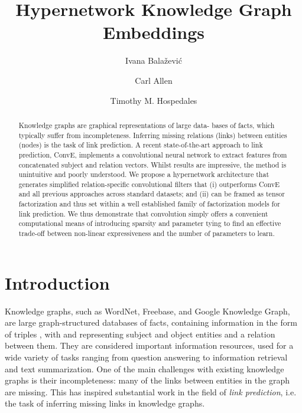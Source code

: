 \documentclass[runningheads]{llncs}
\begin{document}
\title{Hypernetwork Knowledge Graph Embeddings}
\author{Ivana Bala\v{z}evi\'c \and
Carl Allen \and
Timothy M. Hospedales}
\maketitle              \begin{abstract}
Knowledge graphs are graphical representations of large data- bases of facts, which typically suffer from incompleteness. Inferring missing relations (links) between entities (nodes) is the task of link prediction. A recent state-of-the-art approach to link prediction, ConvE, implements a convolutional neural network to extract features from concatenated subject and relation vectors. Whilst results are impressive, the method is unintuitive and poorly understood. We propose a hypernetwork architecture that generates simplified relation-specific convolutional filters that (i) outperforms ConvE and all previous approaches across standard datasets; and (ii) can be framed as tensor factorization and thus set within a well established family of factorization models for link prediction. We thus demonstrate that convolution simply offers a convenient computational means of introducing sparsity and parameter tying to find an effective trade-off between non-linear expressiveness and the number of parameters to learn.

\end{abstract}
\section{Introduction}

Knowledge graphs, such as WordNet, Freebase, and Google Knowledge Graph, are large graph-structured databases of facts, containing information in the form of triples , with  and  representing subject and object entities and  a relation between them. They are considered important information resources, used for a wide variety of tasks ranging from question answering to information retrieval and text summarization. One of the main challenges with existing knowledge graphs is their incompleteness: many of the links between entities in the graph are missing. This has inspired substantial work in the field of \emph{link prediction}, i.e. the task of inferring missing links in knowledge graphs.
\end{document}
